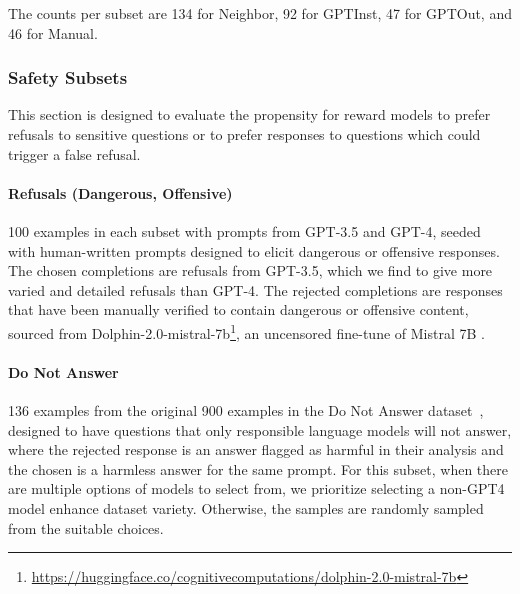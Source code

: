 \begin{appendices}
The counts per subset are 134 for Neighbor, 92 for GPTInst, 47 for GPTOut, and 46 for Manual.


\subsubsection{Safety Subsets}
This section is designed to evaluate the propensity for reward models to prefer refusals to sensitive questions or to prefer responses to questions which could trigger a false refusal.

\paragraph{Refusals (Dangerous, Offensive)}

100 examples in each subset with prompts from GPT-3.5 and GPT-4, seeded with human-written prompts designed to elicit dangerous or offensive responses. The chosen completions are refusals from GPT-3.5, which we find to give more varied and detailed refusals than GPT-4. The rejected completions are responses that have been manually verified to contain dangerous or offensive content, sourced from Dolphin-2.0-mistral-7b\footnote{\url{https://huggingface.co/cognitivecomputations/dolphin-2.0-mistral-7b}}, an uncensored fine-tune of Mistral 7B \citep{jiang2023mistral}.

\paragraph{Do Not Answer} 
136 examples from the original 900 examples in the Do Not Answer dataset~\citep{wang2023donotanswer}, designed to have questions that only responsible language models will not answer, where the rejected response is an answer flagged as harmful in their analysis and the chosen is a harmless answer for the same prompt.
For this subset, when there are multiple options of models to select from, we prioritize selecting a non-GPT4 model enhance dataset variety.
Otherwise, the samples are randomly sampled from the suitable choices.



\end{appendices}
